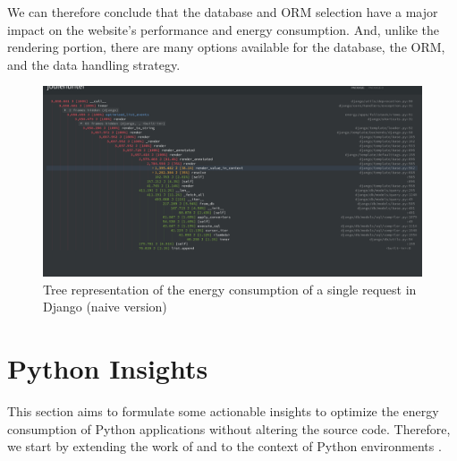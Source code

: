 We can therefore conclude that the database and ORM selection have a major impact on the website's performance and energy consumption.
And, unlike the rendering portion, there are many options available for the database, the ORM, and the data handling strategy.

\begin{figure}[hbt]
    \centering
    \includegraphics[width=\linewidth]{imgs/django_profiled_optimized}
    \caption{Tree representation of the energy consumption of a single request in Django (naive version)}
    \label{fig:django_profiled_optimized}
\end{figure}



\section{Python Insights}
This section aims to formulate some actionable insights to optimize the energy consumption of Python applications without altering the source code.
Therefore, we start by extending the work of \citeauthor{hasan_energy_2016} and
\citeauthor{oliveira_recommending_nodate} to the context of Python environments
\cite{hasan_energy_2016,oliveira_recommending_nodate}.

